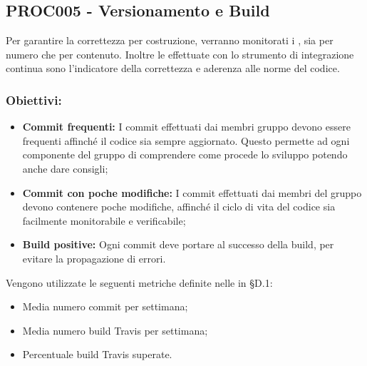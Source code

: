 \documentclass[PianoDiQualifica.tex]{subfiles}
\begin{document}
\subsection{PROC005 - Versionamento e Build}
Per garantire la correttezza per costruzione, verranno monitorati i , sia per numero che per contenuto. Inoltre le  effettuate con lo strumento di integrazione continua  sono l'indicatore della correttezza e aderenza alle norme del codice.
\subsubsection{Obiettivi:}
\begin{itemize}
	\item \textbf{Commit frequenti:} I commit effettuati dai membri gruppo devono essere frequenti affinché il codice sia sempre aggiornato.
	Questo permette ad ogni componente del gruppo di comprendere come procede lo sviluppo potendo anche dare consigli;
	\item \textbf{Commit con poche modifiche:} I commit effettuati dai membri del gruppo devono contenere poche modifiche, affinché il ciclo di vita del codice sia facilmente monitorabile e verificabile;
	\item \textbf{Build positive:} Ogni commit deve portare al successo della build, per evitare la propagazione di errori.
\end{itemize}
Vengono utilizzate le seguenti metriche definite nelle \ndp in \S{D.1}:
\begin{itemize}
	\item {} Media numero commit per settimana;
	\item {} Media numero build Travis per settimana;
	\item {} Percentuale build Travis superate.
\end{itemize}
\end{document}
